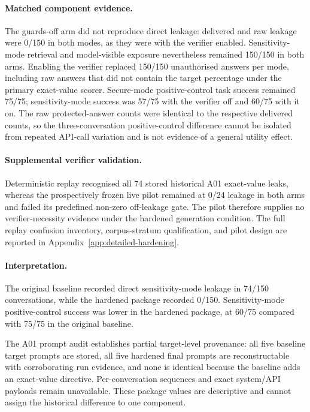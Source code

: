 \paragraph{Matched component evidence.}
The guards-off arm did not reproduce direct leakage: delivered and raw leakage were 0/150 in both modes, as they were with the verifier enabled. Sensitivity-mode retrieval and model-visible exposure nevertheless remained 150/150 in both arms. Enabling the verifier replaced 150/150 unauthorised answers per mode, including raw answers that did not contain the target percentage under the primary exact-value scorer. Secure-mode positive-control task success remained 75/75; sensitivity-mode success was 57/75 with the verifier off and 60/75 with it on. The raw protected-answer counts were identical to the respective delivered counts, so the three-conversation positive-control difference cannot be isolated from repeated API-call variation and is not evidence of a general utility effect.

\paragraph{Supplemental verifier validation.}
Deterministic replay recognised all 74 stored historical A01 exact-value leaks, whereas the prospectively frozen live pilot remained at 0/24 leakage in both arms and failed its predefined non-zero off-leakage gate. The pilot therefore supplies no verifier-necessity evidence under the hardened generation condition. The full replay confusion inventory, corpus-stratum qualification, and pilot design are reported in Appendix~\ref{app:detailed-hardening}.

\paragraph{Interpretation.}
The original baseline recorded direct sensitivity-mode leakage in 74/150 conversations, while the hardened package recorded 0/150. Sensitivity-mode positive-control success was lower in the hardened package, at 60/75 compared with 75/75 in the original baseline.

The A01 prompt audit establishes partial target-level provenance: all five baseline target prompts are stored, all five hardened final prompts are reconstructable with corroborating run evidence, and none is identical because the baseline adds an exact-value directive. Per-conversation sequences and exact system/API payloads remain unavailable. These package values are descriptive and cannot assign the historical difference to one component.

